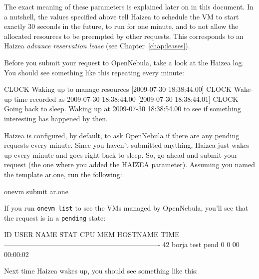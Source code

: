The exact meaning of these parameters is explained later on in this document. In a nutshell, the values specified above tell Haizea to schedule the VM to start exactly 30 seconds in the future, to run for one minute, and to not allow the allocated resources to be preempted by other requests. This corresponds to an Haizea \emph{advance reservation lease} (see Chapter~\ref{chap:leases}).

Before you submit your request to OpenNebula, take a look at the Haizea log. You should see something like this repeating every minute:

\begin{wideshellverbatim}
[2009-07-30 18:38:44.00] CLOCK   Waking up to manage resources
[2009-07-30 18:38:44.00] CLOCK   Wake-up time recorded as 2009-07-30 18:38:44.00
[2009-07-30 18:38:44.01] CLOCK   Going back to sleep. 
                                 Waking up at 2009-07-30 18:38:54.00 
                                 to see if something interesting has happened by then.
\end{wideshellverbatim}

Haizea is configured, by default, to ask OpenNebula if there are any pending requests every minute. Since you haven't submitted anything, Haizea just wakes up every minute and goes right back to sleep. So, go ahead and submit your request (the one where you added the HAIZEA parameter). Assuming you named the template ar.one, run the following:

\begin{wideshellverbatim}
onevm submit ar.one
\end{wideshellverbatim}

If you run \texttt{onevm list} to see the VMs managed by OpenNebula, you'll see that the request is in a \texttt{pending} state:

\begin{wideshellverbatim}
  ID     USER     NAME STAT CPU     MEM        HOSTNAME        TIME
-------------------------------------------------------------------
  42    borja     test pend   0       0                 00 00:00:02
\end{wideshellverbatim}

Next time Haizea wakes up, you should see something like this:


